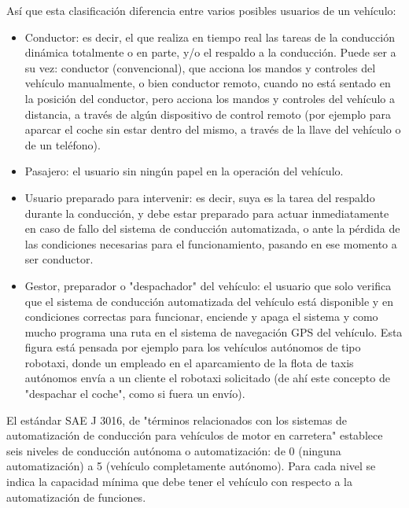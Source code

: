 \documentclass{pclass}
\begin{document}
Así que esta clasificación diferencia entre varios posibles usuarios de un vehículo:
\begin{itemize}
	\item Conductor: es decir, el que realiza en tiempo real las tareas de la conducción dinámica totalmente o en parte, y/o el respaldo a la conducción. Puede ser a su vez: conductor (convencional), que acciona los mandos y controles del vehículo manualmente, o bien conductor remoto, cuando no está sentado en la posición del conductor, pero acciona los mandos y controles del vehículo a distancia, a través de algún dispositivo de control remoto (por ejemplo para aparcar el coche sin estar dentro del mismo, a través de la llave del vehículo o de un teléfono).

	\item Pasajero: el usuario sin ningún papel en la operación del vehículo.

	\item Usuario preparado para intervenir: es decir, suya es la tarea del respaldo durante la conducción, y debe estar preparado para actuar inmediatamente en caso de fallo del sistema de conducción automatizada, o ante la pérdida de las condiciones necesarias para el funcionamiento, pasando en ese momento a ser conductor.

	\item Gestor, preparador o "despachador" del vehículo: el usuario que solo verifica que el sistema de conducción automatizada del vehículo está disponible y en condiciones correctas para funcionar, enciende y apaga el sistema y como mucho programa una ruta en el sistema de navegación GPS del vehículo. Esta figura está pensada por ejemplo para los vehículos autónomos de tipo robotaxi, donde un empleado en el aparcamiento de la flota de taxis autónomos envía a un cliente el robotaxi solicitado (de ahí este concepto de "despachar el coche", como si fuera un envío).


\end{itemize}

El estándar SAE J 3016, de "términos relacionados con los sistemas de automatización de conducción para vehículos de motor en carretera" establece seis niveles de conducción autónoma o automatización: de 0 (ninguna automatización) a 5 (vehículo completamente autónomo). Para cada nivel se indica la capacidad mínima que debe tener el vehículo con respecto a la automatización de funciones.
\end{document}
